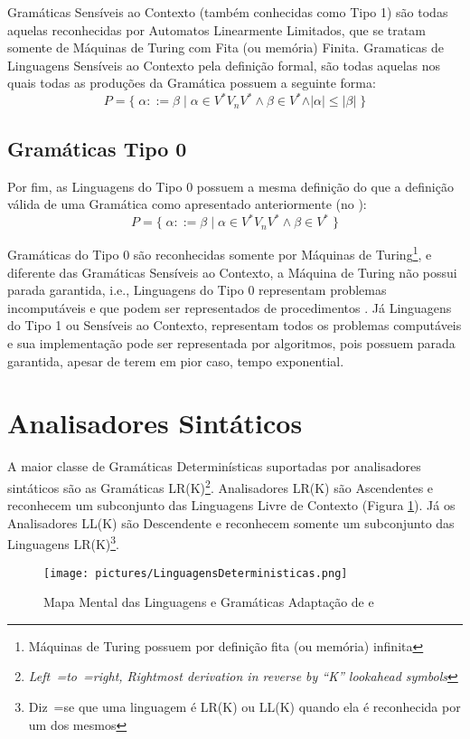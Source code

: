 {    Gramáticas Sensíveis ao Contexto (também conhecidas como Tipo 1) são
    todas aquelas reconhecidas por Automatos Linearmente Limitados,
    que se tratam somente de Máquinas de Turing com Fita (ou memória) Finita.
    Gramaticas de Linguagens Sensíveis ao Contexto pela definição formal,
    são todas aquelas nos quais todas as produções da Gramática possuem a seguinte forma:
    $$ P = \{\; \alpha ::= \beta \;|\; \alpha \in V^* V_n V^* \land \beta \in V^*
                \land \vert\alpha\vert \leq \vert\beta\vert \;\} $$


\subsection*{Gramáticas Tipo 0}

    Por fim,
    as Linguagens do Tipo 0 possuem a mesma definição do que a definição
    válida de uma Gramática como apresentado anteriormente (no
    ):
    $$ P = \{\; \alpha ::= \beta \;|\; \alpha \in V^* V_n V^* \land \beta \in V^* \;\} $$

    Gramáticas do Tipo 0 são reconhecidas somente por Máquinas de Turing\footnote{Máquinas
    de Turing possuem por definição fita (ou memória) infinita
    },
    e diferente das Gramáticas Sensíveis ao Contexto,
    a Máquina de Turing não possui parada garantida,
    i.e.,
    Linguagens do Tipo 0 representam problemas incomputáveis e
    que podem ser representados de procedimentos \cite{sipserBook}.
    Já Linguagens do Tipo 1 ou Sensíveis ao Contexto,
    representam todos os problemas computáveis e
    sua implementação pode ser representada por algoritmos,
    pois possuem parada garantida,
    apesar de terem em pior caso,
    tempo exponential.


\section{Analisadores Sintáticos}
\label{analisadoresSintaticos}

    A maior classe de Gramáticas Determinísticas suportadas por analisadores
    sintáticos são as Gramáticas LR(K)\footnote{\textit{Left~=to~=right,
    Rightmost derivation in reverse by ``K'' lookahead symbols
    }}.
    Analisadores LR(K) \cite{ahoCompilerDragonBook} são Ascendentes e
    reconhecem um subconjunto das Linguagens Livre de Contexto
    (Figura \ref{fig:pictures/LinguagensDeterministicas.png}).
    Já os Analisadores LL(K) são Descendente e
    reconhecem somente um subconjunto das Linguagens LR(K)\footnote{Diz~=se que
    uma linguagem é LR(K) ou LL(K) quando ela é reconhecida por um dos mesmos}.
    \begin{figure}[H]
    \centering
    \texttt{[image: pictures/LinguagensDeterministicas.png]}
    \caption{Mapa Mental das Linguagens e
    Gramáticas \newline Adaptação de  e
    }
    \label{fig:pictures/LinguagensDeterministicas.png}
    \end{figure}

}
